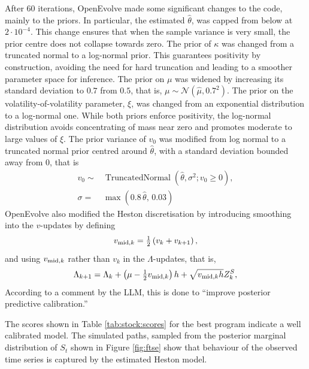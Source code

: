 \documentclass[11pt]{report}
\begin{document}
After 60 iterations, OpenEvolve made some significant changes to the code,
mainly to the priors. In particular, the estimated $\hat{\theta}$, was 
capped from below at $2 \cdot 10^{-4}$.
This change ensures that when the sample variance is very small, 
the prior centre does not collapse towards zero.
The prior of $\kappa$ was changed from a truncated normal
to a log-normal prior. 
This guarantees positivity by construction, avoiding the need for 
hard truncation and leading to a smoother parameter space for inference.
The prior on $\mu$ was widened by increasing its standard deviation to 
$0.7$ from $0.5$, that is, $\mu \sim \mathcal{N}(\hat{\mu}, 0.7^2)$.
The prior on the volatility-of-volatility parameter, $\xi$,
was changed from an exponential distribution to a log-normal one.
While both priors enforce positivity, the log-normal distribution 
avoids concentrating of mass near zero and promotes
moderate to large values of $\xi$.
The prior variance of $v_0$ was modified from 
log normal to a truncated normal prior centred around 
$\hat{\theta}$, with a standard deviation
bounded away from 0, that is
\begin{subequations}
    \begin{align}
        v_0 \sim{}& \operatorname{TruncatedNormal}(\hat{\theta}, \sigma^2; v_0 \geq 0), 
        \\
        \sigma ={}& \max\left(0.8\,\hat{\theta},\, 0.03\right)
    \end{align}
\end{subequations}
OpenEvolve also modified the Heston discretisation by 
introducing smoothing into the $v$-updates by 
defining
\begin{equation}
v_{{\rm mid}, k} = \tfrac{1}{2}\left(v_k + v_{k+1}\right),
\end{equation}
and using $v_{{\rm mid}, k}$ rather than $v_k$ in the 
$\Lambda$-updates, that is,
\begin{equation}
    \Lambda_{k+1} 
{}={} 
    \Lambda_k 
    + \left(\mu - \tfrac{1}{2}v_{{\rm mid}, k}\right)h 
    + \sqrt{v_{{\rm mid}, k} h} Z_k^S,
\label{eq:lambda-updates:v2}
\end{equation}
According to a comment by the LLM, this is done 
to ``improve posterior predictive calibration.''

The scores shown in Table \ref{tab:stock:scores}
for the best program indicate a well calibrated model.
The simulated paths, sampled from the posterior 
marginal distribution of $S_t$ shown in Figure 
\ref{fig:ftse} show that behaviour of the observed time 
series is captured by the estimated Heston model.
\end{document}
